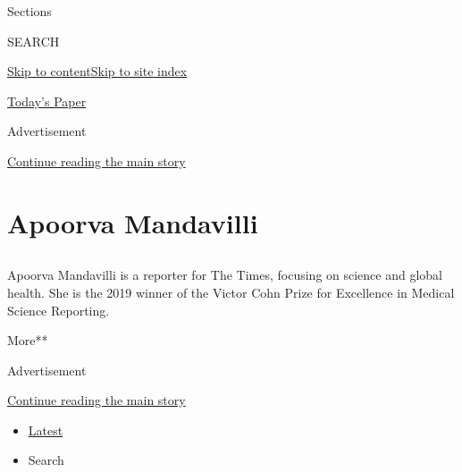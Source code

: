 Sections

SEARCH

\protect\hyperlink{site-content}{Skip to
content}\protect\hyperlink{site-index}{Skip to site index}

\href{https://myaccount.nytimes3xbfgragh.onion/auth/login?response_type=cookie\&client_id=vi}{}

\href{https://www.nytimes3xbfgragh.onion/section/todayspaper}{Today's
Paper}

Advertisement

\protect\hyperlink{after-top}{Continue reading the main story}

\hypertarget{apoorva-mandavilli}{%
\section{Apoorva Mandavilli}\label{apoorva-mandavilli}}

\subsection{}

Apoorva Mandavilli is a reporter for The Times, focusing on science and
global health. She is the 2019 winner of the Victor Cohn Prize for
Excellence in Medical Science Reporting.

More**

Advertisement

\protect\hyperlink{after-mid1}{Continue reading the main story}

\begin{itemize}
\tightlist
\item
  \protect\hyperlink{stream-panel}{Latest}
\item
  Search
\end{itemize}

